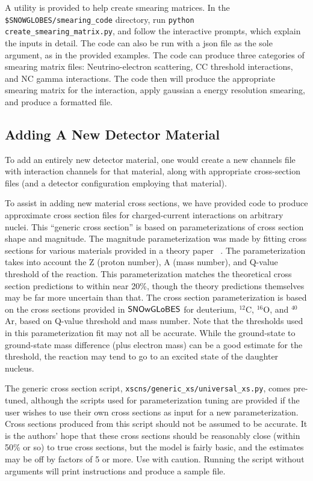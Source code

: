 \documentclass[12pt]{article}
\newcommand{\snowglobes}{\sf{SNOwGLoBES}}
\begin{document}
A utility is provided to help create smearing matrices.  In the
\texttt{\$SNOWGLOBES/smearing\_code} directory, run 
\texttt{python create\_smearing\_matrix.py}, and follow the interactive prompts,
which explain the inputs in detail.
The code can also be run with a json file as the sole argument, as in the provided
examples.  The code can produce three categories of smearing matrix files:
Neutrino-electron scattering, CC threshold interactions, and NC gamma interactions.
The code then will produce the appropriate smearing matrix for the interaction,
apply gaussian a energy resolution smearing, and produce a formatted file.

\subsection{Adding A New Detector Material}

To add an entirely new detector material, one would create a new
channels file with interaction channels for that material, along with
appropriate cross-section files (and a detector
configuration employing that material).

To assist in adding new material cross sections, we have provided code to produce
approximate cross section files for charged-current interactions on arbitrary nuclei.  This ``generic cross section''
is based on parameterizations of cross section shape and magnitude.  The magnitude
parameterization was made by fitting cross sections 
for various materials provided in a theory paper ~\cite{SajjadAthar:2005ke}.
The parameterization takes into account the Z (proton number), A (mass number),
and Q-value threshold of the reaction.  This parameterization matches the theoretical
cross section predictions to within near 20\%, though the theory predictions themselves
may be far more uncertain than that.  The cross section parameterization is
based on the cross sections provided in $\snowglobes$ for deuterium, $^{12}$C,
$^{16}$O, and $^{40}$Ar, based on Q-value threshold and mass number.  Note that
the thresholds used in this parameterization fit may not all be accurate.
While the ground-state to ground-state mass difference (plus electron mass) can be a good estimate for
the threshold, the reaction may tend to go to an excited state of the daughter nucleus.

The generic cross section script, \texttt{xscns/generic\_xs/universal\_xs.py},
comes pre-tuned, although the scripts used for parameterization tuning are provided
if the user wishes to use their own cross sections as input for a new
parameterization.  Cross sections produced from this script should not be assumed
to be accurate.  It is the authors' hope that these cross sections should be reasonably
close (within 50\% or so) to true cross sections, but the model is fairly basic,
and the estimates may be off by factors of 5 or more.  Use with caution.
Running the script without arguments will print instructions and produce a
sample file.
\end{document}
